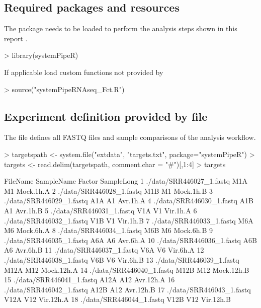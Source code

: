 \documentclass{article}
\begin{document}
\subsection{Required packages and resources}
The  package needs to be loaded to perform the analysis steps shown in this report \citep{Girke2014-oy}. 
\begin{Schunk}
\begin{Sinput}
> library(systemPipeR)
\end{Sinput}
\end{Schunk}

If applicable load custom functions not provided by 
\begin{Schunk}
\begin{Sinput}
> source("systemPipeRNAseq_Fct.R")
\end{Sinput}
\end{Schunk}

\subsection{Experiment definition provided by  file}
The \href{run:targets.txt}{} file defines all FASTQ files and sample comparisons of the analysis workflow. 
\begin{Schunk}
\begin{Sinput}
> targetspath <- system.file("extdata", "targets.txt", package="systemPipeR")
> targets <- read.delim(targetspath, comment.char = "#")[,1:4]
> targets
\end{Sinput}
\begin{Soutput}
                   FileName SampleName Factor SampleLong
1  ./data/SRR446027_1.fastq        M1A     M1  Mock.1h.A
2  ./data/SRR446028_1.fastq        M1B     M1  Mock.1h.B
3  ./data/SRR446029_1.fastq        A1A     A1   Avr.1h.A
4  ./data/SRR446030_1.fastq        A1B     A1   Avr.1h.B
5  ./data/SRR446031_1.fastq        V1A     V1   Vir.1h.A
6  ./data/SRR446032_1.fastq        V1B     V1   Vir.1h.B
7  ./data/SRR446033_1.fastq        M6A     M6  Mock.6h.A
8  ./data/SRR446034_1.fastq        M6B     M6  Mock.6h.B
9  ./data/SRR446035_1.fastq        A6A     A6   Avr.6h.A
10 ./data/SRR446036_1.fastq        A6B     A6   Avr.6h.B
11 ./data/SRR446037_1.fastq        V6A     V6   Vir.6h.A
12 ./data/SRR446038_1.fastq        V6B     V6   Vir.6h.B
13 ./data/SRR446039_1.fastq       M12A    M12 Mock.12h.A
14 ./data/SRR446040_1.fastq       M12B    M12 Mock.12h.B
15 ./data/SRR446041_1.fastq       A12A    A12  Avr.12h.A
16 ./data/SRR446042_1.fastq       A12B    A12  Avr.12h.B
17 ./data/SRR446043_1.fastq       V12A    V12  Vir.12h.A
18 ./data/SRR446044_1.fastq       V12B    V12  Vir.12h.B
\end{Soutput}
\end{Schunk}
\end{document}
